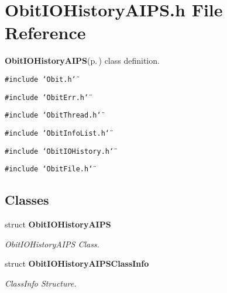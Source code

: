 \section{Obit\-IOHistory\-AIPS.h File Reference}
\label{ObitIOHistoryAIPS_8h}
{\bf Obit\-IOHistory\-AIPS}{\rm (p.\,\pageref{structObitIOHistoryAIPS})} class definition. 

{\tt \#include \char`\"{}Obit.h\char`\"{}}\par
{\tt \#include \char`\"{}Obit\-Err.h\char`\"{}}\par
{\tt \#include \char`\"{}Obit\-Thread.h\char`\"{}}\par
{\tt \#include \char`\"{}Obit\-Info\-List.h\char`\"{}}\par
{\tt \#include \char`\"{}Obit\-IOHistory.h\char`\"{}}\par
{\tt \#include \char`\"{}Obit\-File.h\char`\"{}}\par
\subsection*{Classes}
\begin{CompactItemize}
\item 
struct {\bf Obit\-IOHistory\-AIPS}
\begin{CompactList}\small\item\em Obit\-IOHistory\-AIPS Class. \item\end{CompactList}\item 
struct {\bf Obit\-IOHistory\-AIPSClass\-Info}
\begin{CompactList}\small\item\em Class\-Info Structure. \item\end{CompactList}\end{CompactItemize}
